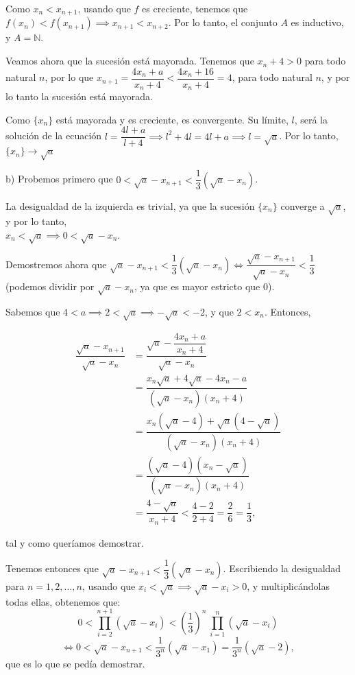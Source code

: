 \documentclass[10pt,a4paper]{article}
\begin{document}
	Como $x_n < x_{n+1}$, usando que $f$ es creciente, tenemos que $f(x_n) < f(x_{n+1}) \implies x_{n+1} < x_{n+2}$. Por lo tanto, el conjunto $A$ es inductivo, y $A = \mathbb{N}$. \newline
	
	Veamos ahora que la sucesión está mayorada. Tenemos que $x_n + 4 >0$ para todo natural $n$, por lo que
	$x_{n+1} = \dfrac{4x_n +a}{x_n + 4} < \dfrac{4x_n +16}{x_n + 4} = 4$, para todo natural $n$, y por lo tanto la sucesión está mayorada.
	
	Como $\{x_n\}$ está mayorada y es creciente, es convergente. Su límite, $l$, será la solución de la ecuación $l = \dfrac{4l+a}{l+4} \implies l^2 + 4l = 4l + a \implies l = \sqrt{a}$. Por lo tanto, $\{x_n\} \rightarrow \sqrt{a}$ \newline
	
	b) Probemos primero que $0 < \sqrt{a} - x_{n+1} < \dfrac{1}{3} (\sqrt{a}-x_n)$.
	
	La desigualdad de la izquierda es trivial, ya que la sucesión $\{x_n\}$ converge a $\sqrt{a}$, y por lo tanto, \\ $x_n < \sqrt{a} \implies 0 < \sqrt{a}-x_n$.
	
	Demostremos ahora que $\sqrt{a} - x_{n+1} < \dfrac{1}{3} (\sqrt{a}-x_n) \Leftrightarrow \dfrac{\sqrt{a} - x_{n+1}}{\sqrt{a}-x_n} < \dfrac{1}{3}$ (podemos dividir por $\sqrt{a}-x_n$, ya que es mayor estricto que 0).
	
	Sabemos que $4 < a \implies 2 < \sqrt{a} \implies -\sqrt{a} < -2$, y que $2 < x_n$. Entonces,
	
	\begin{equation*}
		\begin{split}
			\dfrac{\sqrt{a} - x_{n+1}}{\sqrt{a}-x_n} 
			& = \dfrac{\sqrt{a} - \dfrac{4x_n +a}{x_n + 4}}{\sqrt{a}-x_n} \\
			& = \dfrac{x_n \sqrt{a} + 4 \sqrt{a} - 4x_n - a}{(\sqrt{a}-x_n)(x_n + 4)} \\
			& = \dfrac{x_n(\sqrt{a}-4) + \sqrt{a}(4-\sqrt{a})}{(\sqrt{a}-x_n)(x_n + 4)} \\
			& = \dfrac{(\sqrt{a} -4)(x_n - \sqrt{a})}{(\sqrt{a}-x_n)(x_n + 4)} \\
			& = \dfrac{4 - \sqrt{a}}{x_n+ 4} < \dfrac{4 - 2}{2+4} = \dfrac{2}{6} = \dfrac{1}{3},
		\end{split}
	\end{equation*}
	
	tal y como queríamos demostrar. \newline
	
	Tenemos entonces que $\sqrt{a} - x_{n+1} < \dfrac{1}{3} (\sqrt{a}-x_n)$. Escribiendo la desigualdad para $n = 1, 2, \dots, n$, usando que $x_i < \sqrt{a} \implies \sqrt{a} - x_i > 0$, y multiplicándolas todas ellas, obtenemos que:
	$$ 0 < \prod_{i = 2}^{n+1} (\sqrt{a} - x_i) < \left( \dfrac{1}{3} \right) ^ n ~ \prod_{i = 1}^{n}(\sqrt{a}-x_i)$$
	$$\Leftrightarrow 0 < \sqrt{a} - x_{n+1} < \dfrac{1}{3^n} (\sqrt{a} - x_1) = \dfrac{1}{3^n}(\sqrt{a} -2),$$
	que es lo que se pedía demostrar.
	
	
\end{document}
